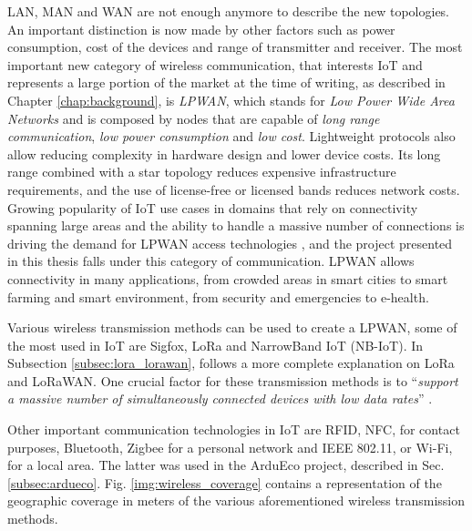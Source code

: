 		LAN, MAN and WAN are not enough anymore to describe the new topologies.
		An important distinction is now made by other factors such as power consumption, cost of the devices and range of transmitter and receiver.	
		The most important new category of wireless communication, that interests IoT and represents a large portion of the market at the time of writing, as described in Chapter \ref{chap:background}, is \textit{LPWAN}, which stands for \textit{Low Power Wide Area Networks} and is composed by nodes that are capable of \textit{long range communication}, \textit{low power consumption} and \textit{low cost}.
		Lightweight protocols also allow reducing complexity in hardware design and lower device costs.
		Its long range combined with a star topology reduces expensive infrastructure requirements, and the use of license-free or licensed bands reduces network costs.
		Growing popularity of IoT use cases in domains that rely on connectivity spanning large areas and the ability to handle a massive number of connections is driving the demand for LPWAN access technologies \cite{fi12030046}, and the project presented in this thesis falls under this category of communication.
		LPWAN allows connectivity in many applications, from crowded areas in smart cities to smart farming and smart environment, from security and emergencies to e-health.
		
		Various wireless transmission methods can be used to create a LPWAN, some of the most used in IoT are Sigfox, LoRa and NarrowBand IoT (NB-IoT).
		In Subsection \ref{subsec:lora_lorawan}, follows a more complete explanation on LoRa and LoRaWAN.
		One crucial factor for these transmission methods is to ``\textit{support a massive number of simultaneously connected devices with low data rates}'' \cite{fi12030046}.
		
		Other important communication technologies in IoT are RFID, NFC, for contact purposes, Bluetooth, Zigbee for a personal network and IEEE 802.11, or Wi-Fi, for a local area.
		The latter was used in the ArduEco project, described in Sec. \ref{subsec:ardueco}.
		Fig. \ref{img:wireless_coverage} contains a representation of the geographic coverage in meters of the various aforementioned wireless transmission methods.
	
